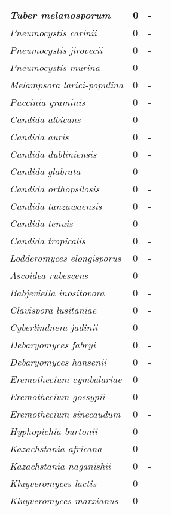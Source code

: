 {\begin{longtable}{| L{4cm} | L{2cm}  | L{5cm} | L{4cm} |}
\textit{Tuber melanosporum} & 0 & - & \\ \hline
\textit{Pneumocystis carinii} & 0 & - & \\ \hline
\textit{Pneumocystis jirovecii} & 0 & - & \\ \hline
\textit{Pneumocystis murina} & 0 & - & \\ \hline
\textit{Melampsora larici-populina} & 0 & - & \\ \hline
\textit{Puccinia graminis} & 0 & - & \\ \hline
\textit{Candida albicans} & 0 & - & \\ \hline
\textit{Candida auris} & 0 & - & \\ \hline
\textit{Candida dubliniensis} & 0 & - & \\ \hline
\textit{Candida glabrata} & 0 & - & \\ \hline
\textit{Candida orthopsilosis} & 0 & - & \\ \hline
\textit{Candida tanzawaensis} & 0 & - & \\ \hline
\textit{Candida tenuis} & 0 & - & \\ \hline
\textit{Candida tropicalis} & 0 & - & \\ \hline
\textit{Lodderomyces elongisporus} & 0 & - & \\ \hline
\textit{Ascoidea rubescens} & 0 & - & \\ \hline
\textit{Babjeviella inositovora} & 0 & - & \\ \hline
\textit{Clavispora lusitaniae} & 0 & - & \\ \hline
\textit{Cyberlindnera jadinii} & 0 & - & \\ \hline
\textit{Debaryomyces fabryi} & 0 & - & \\ \hline
\textit{Debaryomyces hansenii} & 0 & - & \\ \hline
\textit{Eremothecium cymbalariae} & 0 & - & \\ \hline
\textit{Eremothecium gossypii} & 0 & - & \\ \hline
\textit{Eremothecium sinecaudum} & 0 & - & \\ \hline
\textit{Hyphopichia burtonii} & 0 & - & \\ \hline
\textit{Kazachstania africana} & 0 & - & \\ \hline
\textit{Kazachstania naganishii} & 0 & - & \\ \hline
\textit{Kluyveromyces lactis} & 0 & - & \\ \hline
\textit{Kluyveromyces marxianus} & 0 & - & \\ \hline

\end{longtable}}
